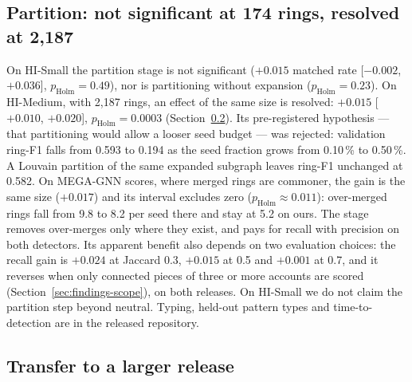 \subsection{Partition: not significant at 174 rings, resolved at 2{,}187}
\label{sec:results-partition}

On HI-Small the partition stage is not significant ($+0.015$ matched rate
[$-0.002$, $+0.036$], $p_{\mathrm{Holm}}=0.49$), nor is partitioning without expansion
($p_{\mathrm{Holm}}=0.23$). On HI-Medium, with 2{,}187 rings, an effect of the same size is
resolved: $+0.015$ [$+0.010$, $+0.020$], $p_{\mathrm{Holm}}=0.0003$
(Section~\ref{sec:results-hm}).
Its pre-registered hypothesis --- that partitioning would allow a
looser seed budget --- was rejected: validation ring-F1 falls from 0.593 to 0.194 as the seed
fraction grows from 0.10\,\% to 0.50\,\%. A Louvain partition of the same expanded subgraph
leaves ring-F1 unchanged at 0.582.
On MEGA-GNN scores, where merged rings are commoner, the gain is the same size ($+0.017$)
and its interval excludes zero ($p_{\mathrm{Holm}} \approx 0.011$): over-merged rings fall
from 9.8 to 8.2 per seed there and stay at 5.2 on ours. The stage removes over-merges only
where they exist, and pays for recall with precision on both detectors.
Its apparent benefit also depends on two evaluation choices: the recall gain is $+0.024$ at
Jaccard 0.3, $+0.015$ at 0.5 and $+0.001$ at 0.7, and it reverses when only connected pieces
of three or more accounts are scored (Section~\ref{sec:findings-scope}), on both releases.
On HI-Small we do not claim the partition step beyond neutral. Typing, held-out pattern types and time-to-detection are
in the released repository.

\subsection{Transfer to a larger release}
\label{sec:results-hm}

